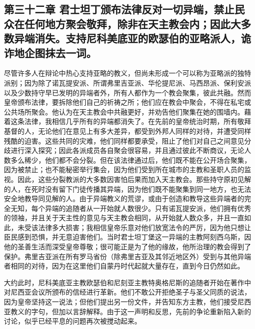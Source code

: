 
\subsection{第三十二章 君士坦丁颁布法律反对一切异端，禁止民众在任何地方聚会敬拜，除非在天主教会内；因此大多数异端消失。支持尼科美底亚的欧瑟伯的亚略派人，诡诈地企图抹去一词。}

尽管许多人在辩论中热心支持亚略的教义，但尚未形成一个可以称为亚略派的独特派别；因为除了诺瓦提安派、所谓弗里吉亚派、华伦提尼派、马西昂派、保利安派以及少数持守早已发明的异端者外，所有人都作为一个教会聚集，彼此共融。然而皇帝颁布法律，要拆除他们自己的祈祷之所；他们应在教会中聚会，不得在私宅或公共场所聚会。他认为在天主教会中共融更好，并劝告他们聚集在她的围墙内。藉着这条法律，我相信几乎所有的异端都消失了。在先前的皇帝统治时期，所有敬拜基督的人，无论他们在意见上有多大差异，都受到外邦人同样的对待，并遭受同样残酷的迫害。这些共同的灾难，他们同样都要承受，阻止了他们对自己之间意见分歧进行深入探究；因此各派成员各自聚会很容易，并且通过彼此不断商议，无论人数多么稀少，他们都不会分裂。但在该法律通过后，他们既不能在公开场合聚集，因为被禁止；也不能秘密举行集会，因为他们受到所在城市的主教和圣职人员的监视。因此，这些分裂教派的大多数因害怕后果而加入天主教会。那些持守原初见解的人，在死时没有留下门徒传播其异端，因为他们既不能聚集到同一地方，也无法安全地教导同见解的人。由于异端教义的荒谬，或由于创造和教导这些异端者的完全无知，每个异端的追随者从一开始就人数很少。只有诺瓦提安派，他们拥有优秀的领袖，并且关于天主性的意见与天主教会相同，从开始就人数众多，并且一直如此，未受该法律多大损害；我相信皇帝乐意对他们放宽法令的严厉，因为他只想让臣民感到恐惧，并无意迫害他们。当时君士坦丁堡这一异端的主教阿刻西乌斯，因他的圣善生活而深受皇帝尊敬；很可能正是为了他的缘故，他所治理的教会得到了保护。弗里吉亚派在所有罗马省份（除弗里吉亚及其邻近地区外）受到与其他异端者相同的对待，因为在这里他们自蒙丹时代起就大量存在，直到今日仍然如此。\par

大约此时，尼科美底亚主教欧瑟伯和尼刻亚主教特奥格尼斯的追随者开始在著作中对尼西亚会议所颁布的信经进行革新。他们不敢公开拒绝圣子与圣父同质的说法，因为皇帝坚持这一说法；但他们提出另一份文件，并告知东方主教，他们接受尼西亚教义的字句，但加以言辞解释。由于这一声明和反思，先前的争论重新陷入新的讨论，似乎已经平息的问题再次被搅动起来。\par


